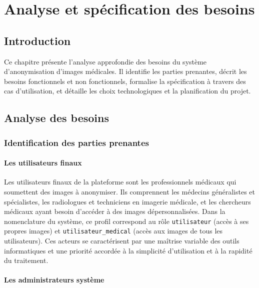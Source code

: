 \chapter{Analyse et spécification des besoins}

\section*{Introduction}
Ce chapitre présente l'analyse approfondie des besoins du système d'anonymisation d'images médicales. Il identifie les parties prenantes, décrit les besoins fonctionnels et non fonctionnels, formalise la spécification à travers des cas d'utilisation, et détaille les choix technologiques et la planification du projet.

\section{Analyse des besoins}

\subsection{Identification des parties prenantes}

\subsubsection{Les utilisateurs finaux}

Les utilisateurs finaux de la plateforme sont les professionnels médicaux qui soumettent des images à anonymiser. Ils comprennent les médecins généralistes et spécialistes, les radiologues et techniciens en imagerie médicale, et les chercheurs médicaux ayant besoin d'accéder à des images dépersonnalisées. Dans la nomenclature du système, ce profil correspond au rôle \texttt{utilisateur} (accès à ses propres images) et \texttt{utilisateur\_medical} (accès aux images de tous les utilisateurs). Ces acteurs se caractérisent par une maîtrise variable des outils informatiques et une priorité accordée à la simplicité d'utilisation et à la rapidité du traitement.

\subsubsection{Les administrateurs système}

